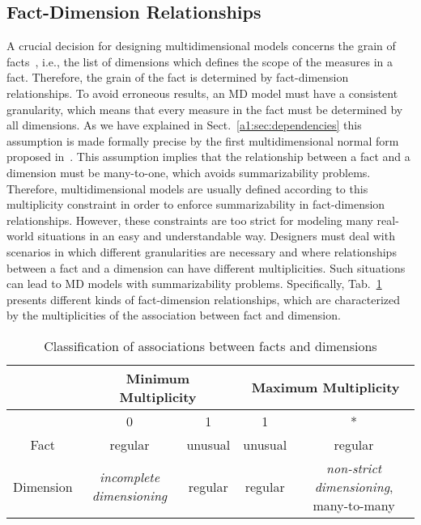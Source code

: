 \subsection{Fact-Dimension Relationships}
A crucial decision for designing multidimensional models concerns
the grain of facts~\cite{book/Kimball/DW}, i.e., the list of
dimensions which defines the scope of the measures in a fact.
Therefore, the grain of the fact is determined by fact-dimension
relationships. To avoid erroneous results, an MD model must have a
consistent granularity, which means that every measure in the fact
must be determined by all dimensions. As we have explained in
Sect.~\ref{a1:sec:dependencies} this assumption is made formally
precise by the first multidimensional normal form proposed
in~\cite{DBLP:journals/is/LechtenborgerV03}. This assumption implies
that the relationship between a fact and a dimension must be
many-to-one, which avoids summarizability problems. Therefore,
multidimensional models are usually defined according to this
multiplicity constraint in order to enforce summarizability in
fact-dimension relationships. However, these constraints are too
strict for modeling many real-world situations in an easy and
understandable way. Designers must deal with scenarios in which
different granularities are necessary and where relationships
between a fact and a dimension can have different multiplicities.
Such situations can lead to MD models with summarizability problems.
Specifically, Tab.~\ref{a1:tab:FD-multiplicity-classification}
presents different kinds of fact-dimension relationships, which are
characterized by the multiplicities of the association between fact
and dimension.

\begin{table}
  \centering
  \caption{Classification of associations between facts and dimensions}
  \label{a1:tab:FD-multiplicity-classification}
    \begin{tabular}{|c||c|c|c|c|}
         \hline
       & \multicolumn{2}{|c|}{Minimum Multiplicity} & \multicolumn{2}{|c|}{Maximum Multiplicity} \\\hline
       & 0 & 1 & 1 & * \\\hline
      Fact & regular & unusual & unusual & regular \\
      Dimension & \emph{incomplete dimensioning} & regular & regular & \emph{non-strict dimensioning}, many-to-many \\\hline
    \end{tabular}
\end{table}

